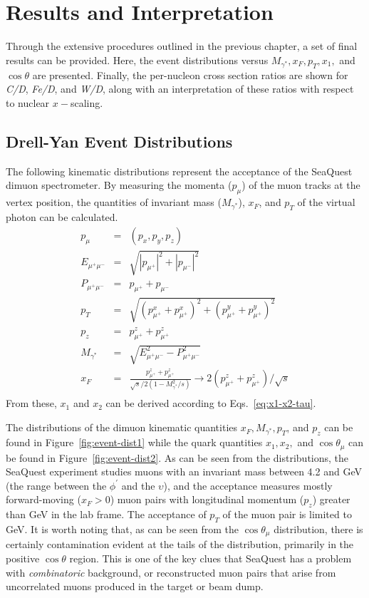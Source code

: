 \chapter{Results and Interpretation}

Through the extensive procedures outlined in the previous chapter, a set of final results can be provided. Here, the event distributions versus $M_{\gamma^*}, x_F, p_T, x_1,$ and $\cos\theta$ are presented. Finally, the per-nucleon cross section ratios are shown for \emph{C/D}, \emph{Fe/D}, and \emph{W/D}, along with an interpretation of these ratios with respect to nuclear $x-$scaling.

\section{Drell-Yan Event Distributions}

The following kinematic distributions represent the acceptance of the SeaQuest dimuon spectrometer. By measuring the momenta ($p_{\mu}$) of the muon tracks at the vertex position, the quantities of invariant mass ($M_{\gamma^*}$), $x_F$, and $p_T$ of the virtual photon can be calculated.
\begin{eqnarray}
p_\mu & = & (p_x, p_y, p_z) \\
E_{\mu^+\mu^-} & = & \sqrt{|p_{\mu^+}|^2 + |p_{\mu^-}|^2} \\
P_{\mu^+\mu^-} & = & p_{\mu^+} + p_{\mu^-} \\
p_T & = & \sqrt{(p_{\mu^+}^x + p_{\mu^+}^x)^2 + (p_{\mu^+}^y + p_{\mu^+}^y )^2} \\
p_z & = & p_{\mu^+}^z + p_{\mu^+}^z \\
M_{\gamma^*} & = & \sqrt{E_{\mu^+\mu^-}^2 - P_{\mu^+\mu^-}^2} \\
x_F & = & \frac{p_{\mu^+}^z + p_{\mu^+}^z }{\sqrt{s}/2 (1-M^2_{\gamma^*}/s)} \rightarrow 2(p_{\mu^+}^z + p_{\mu^+}^z)/\sqrt{s} \\
\end{eqnarray}
From these, $x_1$ and $x_2$ can be derived according to Eqs.~\ref{eq:x1-x2-tau}.

The distributions of the dimuon kinematic quantities $x_F, M_{\gamma^*}, p_T$, and $p_z$ can be found in Figure~\ref{fig:event-dist1} while the quark quantities $x_1, x_2,$ and $\cos\theta_\mu$ can be found in Figure~\ref{fig:event-dist2}. As can be seen from the distributions, the SeaQuest experiment studies muons with an invariant mass between 4.2 and \unit[10]{GeV} (the range between the $\phi^\prime$ and the $\upsilon$), and the acceptance measures mostly forward-moving ($x_F>0$) muon pairs with longitudinal momentum ($p_z$) greater than \unit[40]{GeV} in the lab frame. The acceptance of $p_T$ of the muon pair is limited to \unit[3]{GeV}. It is worth noting that, as can be seen from the $\cos\theta_\mu$ distribution, there is certainly contamination evident at the tails of the distribution, primarily in the positive $\cos\theta$ region. This is one of the key clues that SeaQuest has a problem with \emph{combinatoric} background, or reconstructed muon pairs that arise from uncorrelated muons produced in the target or beam dump.

